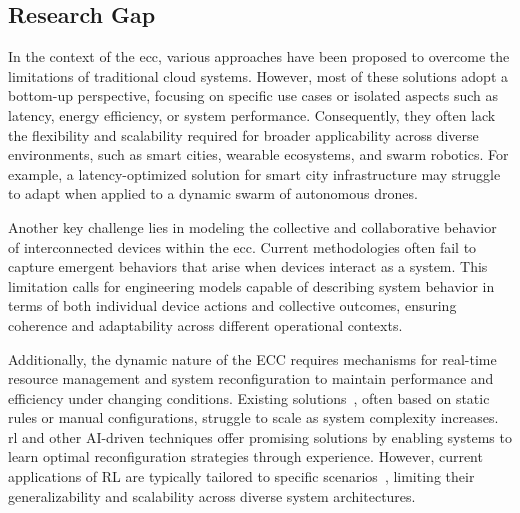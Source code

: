 \documentclass[runningheads]{llncs}
\begin{document}


\subsection{Research Gap}
\label{sec:research-gap}

In the context of the \ac{ecc},
various approaches have been proposed to overcome the limitations of traditional cloud systems.
%
However,
most of these solutions adopt a bottom-up perspective,
focusing on specific use cases or isolated aspects such as latency,
energy efficiency,
or system performance.
%
Consequently,
they often lack the flexibility and scalability required for broader applicability across diverse environments,
such as smart cities,
wearable ecosystems,
and swarm robotics.
%
For example,
a latency-optimized solution for smart city infrastructure may struggle to adapt when applied to a dynamic swarm of autonomous drones.

Another key challenge lies in modeling the collective and collaborative behavior of interconnected devices within the \ac{ecc}.
%
Current methodologies often fail to capture emergent behaviors that arise when devices interact as a system.
%
This limitation calls for engineering models capable of describing system behavior in terms of both individual device actions and collective outcomes,
ensuring coherence and adaptability across different operational contexts.

Additionally,
the dynamic nature of the ECC requires mechanisms for real-time resource management and system reconfiguration to maintain performance and efficiency under changing conditions.
%
Existing solutions~\cite{},
often based on static rules or manual configurations, struggle to scale as system complexity increases.
%
\ac{rl} and other AI-driven techniques offer promising solutions by enabling systems to learn optimal reconfiguration strategies through experience.
%
However,
current applications of RL are typically tailored to specific scenarios~\cite{},
limiting their generalizability and scalability across diverse system architectures.
\end{document}
